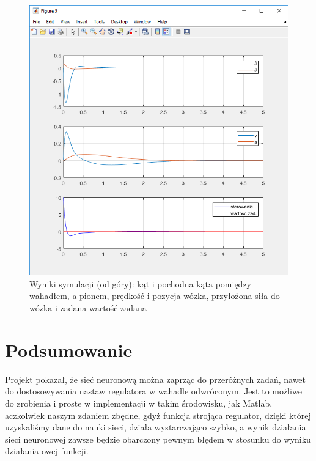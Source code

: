 \documentclass[10pt,a4paper,titlepage]{article}
\begin{document}
	\begin{figure}[H]
		\center
		\includegraphics[width=\textwidth]{wyniksymulacji2.png}
		\caption{Wyniki symulacji (od góry): kąt i pochodna kąta pomiędzy wahadłem, a pionem, prędkość i pozycja wózka, przyłożona siła do wózka i zadana wartość zadana}
	\end{figure}
	
	\section{Podsumowanie}
	Projekt pokazał, że sieć neuronową można zaprząc do przeróżnych zadań, nawet do dostosowywania nastaw regulatora w wahadle odwróconym. Jest to możliwe do zrobienia i proste w implementacji w takim środowisku, jak Matlab, aczkolwiek naszym zdaniem zbędne, gdyż funkcja strojąca regulator, dzięki której uzyskaliśmy dane do nauki sieci, działa wystarczająco szybko, a wynik działania sieci neuronowej zawsze będzie obarczony pewnym błędem w stosunku do wyniku działania owej funkcji.
	
\end{document}
